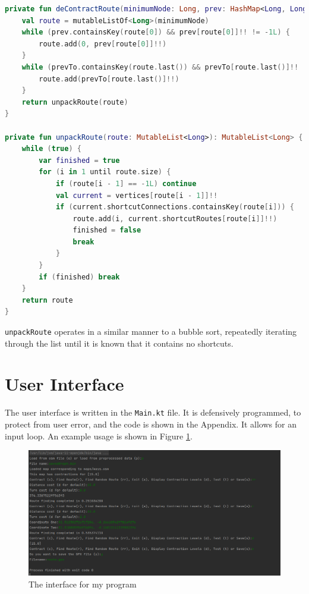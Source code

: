 \documentclass[11pt,twoside,a4paper]{report}
\begin{document}
\begin{lstlisting}[language=kotlin]
private fun deContractRoute(minimumNode: Long, prev: HashMap<Long, Long>, prevTo: HashMap<Long, Long>): List<Long> {
    val route = mutableListOf<Long>(minimumNode)
    while (prev.containsKey(route[0]) && prev[route[0]]!! != -1L) {
        route.add(0, prev[route[0]]!!)
    }
    while (prevTo.containsKey(route.last()) && prevTo[route.last()]!! != -1L) {
        route.add(prevTo[route.last()]!!)
    }
    return unpackRoute(route)
}

private fun unpackRoute(route: MutableList<Long>): MutableList<Long> {
    while (true) {
        var finished = true
        for (i in 1 until route.size) {
            if (route[i - 1] == -1L) continue
            val current = vertices[route[i - 1]]!!
            if (current.shortcutConnections.containsKey(route[i])) {
                route.add(i, current.shortcutRoutes[route[i]]!!)
                finished = false
                break
            }
        }
        if (finished) break
    }
    return route
}
\end{lstlisting}
\texttt{unpackRoute} operates in a similar manner to a bubble sort, repeatedly iterating through the list until it is known that it contains no shortcuts. 
\section{User Interface}
The user interface is written in the \texttt{Main.kt} file. It is defensively programmed, to protect from user error, and the code is shown in the Appendix. It allows for an input loop. An example usage is shown in Figure \ref{interface}.
\begin{figure}[t]
\begin{center}
\includegraphics[width=12cm]{interface.png}
\end{center}
\caption{The interface for my program}
\label{interface}
\end{figure}
\newpage
\end{document}
